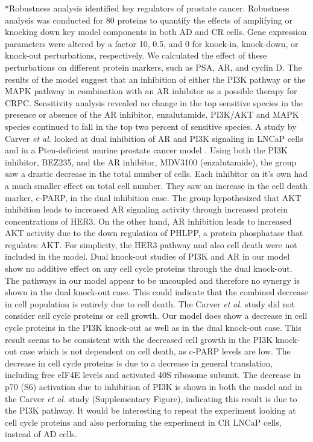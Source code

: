 \documentclass[12pt]{article}
\makeatletter
\renewcommand\subsection{\@startsection
	{subsection}{2}{0mm}
	{-0.05in}
	{-0.5\baselineskip}
	{\normalfont\normalsize\bfseries}}
\makeatother
\begin{document}
\subsection*{Robustness analysis identified key regulators of prostate cancer.} 
Robustness analysis was conducted for 80 proteins to quantify the effects of amplifying or knocking down key model components in both AD and CR cells. 
Gene expression parameters were altered by a factor 10, 0.5, and 0 for knock-in, knock-down, or knock-out perturbations, respectively.
We calculated the effect of these perturbations on different protein markers, such as PSA, AR, and cyclin D. 
The results of the model suggest that an inhibition of either the PI3K pathway or the MAPK pathway in combination with an AR inhibitor as a possible therapy for CRPC. 
Sensitivity analysis revealed no change in the top sensitive species in the presence or absence of the AR inhibitor, enzalutamide. PI3K/AKT and MAPK species continued to fall in the top two percent of sensitive species. 
A study by Carver \textit{et al.} looked at dual inhibition of AR and PI3K signaling in LNCaP cells and in a Pten-deficient murine prostate cancer model \cite{Parker2013}. 
Using both the PI3K inhibitor, BEZ235, and the AR inhibitor, MDV3100 (enzalutamide), the group saw a drastic decrease in the total number of cells. 
Each inhibitor on it’s own had a much smaller effect on total cell number. 
They saw an increase in the cell death marker, c-PARP, in the dual inhibition case. 
The group hypothesized that AKT inhibition leads to increased AR signaling activity through increased protein concentrations of HER3. 
On the other hand, AR inhibition leads to increased AKT activity due to the down regulation of PHLPP, a protein phosphatase that regulates AKT. 
For simplicity, the HER3 pathway and also cell death were not included in the model. 
Dual knock-out studies of PI3K and AR in our model show no additive effect on any cell cycle proteins through the dual knock-out. 
The pathways in our model appear to be uncoupled and therefore no synergy is shown in the dual knock-out case. 
This could indicate that the combined decrease in cell population is entirely due to cell death. 
The Carver \textit{et al.} study did not consider cell cycle proteins or cell growth. 
Our model does show a decrease in cell cycle proteins in the PI3K knock-out as well as in the dual knock-out case. 
This result seems to be consistent with the decreased cell growth in the PI3K knock-out case which is not dependent on cell death, as c-PARP levels are low. 
The decrease in cell cycle proteins is due to a decrease in general translation, including free eIF4E levels and activated 40S ribosome subunit. 
The decrease in p70 (S6) activation due to inhibition of PI3K is shown in both the model and in the Carver \textit{et al.} study (Supplementary Figure), indicating this result is due to the PI3K pathway. 
It would be interesting to repeat the experiment looking at cell cycle proteins and also performing the experiment in CR LNCaP cells, instead of AD cells. 
\end{document}
